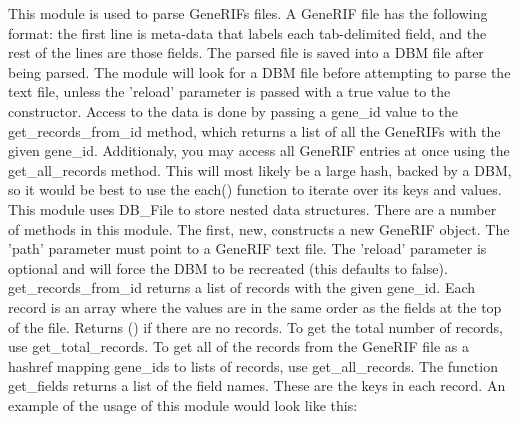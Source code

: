 This module is used to parse GeneRIFs files. A GeneRIF file has the following format: the first line is meta-data that labels each tab-delimited field, and the rest of the lines are those fields.
The parsed file is saved into a DBM file after being parsed. The module will look for a DBM file before attempting to parse the text file, unless the 'reload' parameter is passed with a true value to the constructor.
Access to the data is done by passing a gene\_id value to the get\_records\_from\_id method, which returns a list of all the GeneRIFs with the given gene\_id. Additionaly, you may access all GeneRIF entries at once using the get\_all\_records method. This will most likely be a large hash, backed by a DBM, so it would be best to use the each() function to iterate over its keys and values.
This module uses DB\_File to store nested data structures.
There are a number of methods in this module.
The first, new, constructs a new GeneRIF object. The 'path' parameter must point to a GeneRIF text file. The 'reload' parameter is optional and will force the DBM to be recreated (this defaults to false).
{g}et\_records\_from\_id returns a list of records with the given gene\_id. Each record is an array where the values are in the same order as the fields at the top of the file. Returns () if there are no records. 
To get the total number of records, use get\_total\_records.  To get all of the records from the GeneRIF file as a hashref mapping gene\_ids to lists of records, use get\_all\_records.
The function get\_fields returns a list of the field names. These are the keys in each record.
An example of the usage of this module would look like this:
\\
\\
\\

